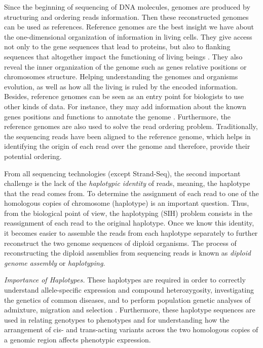 Since the beginning of sequencing of DNA molecules, genomes are produced by structuring and ordering reads information. 
Then these reconstructed genomes can be used
as references. Reference genomes are the best insight we have about the one-dimensional
organization of information in living cells. They give access not only to the gene sequences that lead to proteins, but also to flanking sequences that altogether impact the
functioning of living beings \citep{encode2004encode}. They also reveal the inner organization of the genome
such as genes relative positions or chromosomes structure. Helping understanding the
genomes and organisms evolution, as well as how all the living is ruled by the encoded
information. Besides, reference genomes can be seen as an entry point for biologists to
use other kinds of data. For instance, they may add information about the known genes
positions and functions to annotate the genome \citep{harrow2012gencode}.
Furthermore, the reference genomes are also used to solve the read ordering problem.
Traditionally, the sequencing reads have been aligned to the reference genome, which helps in identifying the origin of each read over the genome and therefore, provide their potential ordering.

From all sequencing technologies (except Strand-Seq), the second important challenge is the lack of the \textit{haplotypic identity} of reads, meaning, the haplotype that the read comes from.
To determine the assignment of each read to one of the homologous copies of chromosome (haplotype) is an important question. 
Thus, from the biological point of view, the haplotyping (SIH) problem consists in the reassignment of each read to the original haplotype.
Once we know this identity, it becomes easier to assemble the reads from each haplotype separately to further reconstruct the two genome sequences of diploid organisms.
The process of reconstructing the diploid assemblies from sequencing reads is known as \textit{diploid genome assembly} or \textit{haplotyping}.

\textit{Importance of Haplotypes.} These haplotypes are required in order to correctly understand allele-specific expression and compound heterozygosity, investigating the genetics of common diseases, and to perform population genetic analyses of admixture, migration and selection \citep{tewhey2011importance, glusman2014whole}. 
Furthermore, these haplotype sequences are used in relating genotypes to phenotypes and for understanding how the arrangement of cis- and trans-acting variants across the two homologous copies of a genomic region affects phenotypic expression.


